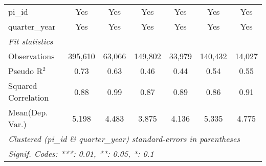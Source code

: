 \begin{tabular}{lcccccc}
   pi\_id                                                     & Yes            & Yes           & Yes           & Yes            & Yes           & Yes\\  
   quarter\_year                                              & Yes            & Yes           & Yes           & Yes            & Yes           & Yes\\  
   \midrule
   \emph{Fit statistics}\\
   Observations                                               & 395,610        & 63,066        & 149,802       & 33,979         & 140,432       & 14,027\\  
   Pseudo R$^2$                                               & 0.73           & 0.63          & 0.46          & 0.44           & 0.54          & 0.55\\  
   Squared Correlation                                        & 0.88           & 0.99          & 0.87          & 0.89           & 0.86          & 0.91\\  
Mean(Dep. Var.) & 5.198 & 4.483 & 3.875 & 4.136 & 5.335 & 4.775 \\
   \midrule \midrule
   \multicolumn{7}{l}{\emph{Clustered (pi\_id \& quarter\_year) standard-errors in parentheses}}\\
   \multicolumn{7}{l}{\emph{Signif. Codes: ***: 0.01, **: 0.05, *: 0.1}}\\
\end{tabular}
\par\endgroup
